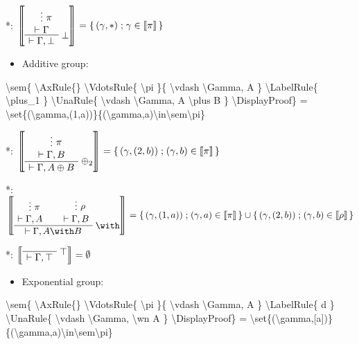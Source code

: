 *: \(\sem{
\AxRule{}
\VdotsRule{ \pi }{ \vdash \Gamma }
\LabelRule{ \bot }
\UnaRule{ \vdash \Gamma, \bot }
\DisplayProof} = \set{(\gamma,*)}{\gamma\in\sem\pi}\)

\begin{itemize}
\tightlist
\item
  Additive group:

  \begin{description}
  \tightlist
  \item[]
  \end{description}
\end{itemize}

\textbackslash{}sem\{ \textbackslash{}AxRule\{\}
\textbackslash{}VdotsRule\{ \textbackslash{}pi \}\{
\textbackslash{}vdash \textbackslash{}Gamma, A \}
\textbackslash{}LabelRule\{ \textbackslash{}plus\_1 \}
\textbackslash{}UnaRule\{ \textbackslash{}vdash \textbackslash{}Gamma, A
\textbackslash{}plus B \} \textbackslash{}DisplayProof\} =
\textbackslash{}set\{(\textbackslash{}gamma,(1,a))\}\{(\textbackslash{}gamma,a)\textbackslash{}in\textbackslash{}sem\textbackslash{}pi\}

*: \(\sem{
\AxRule{}
\VdotsRule{ \pi }{ \vdash \Gamma, B }
\LabelRule{ \plus_2 }
\UnaRule{ \vdash \Gamma, A \plus B }
\DisplayProof} = \set{(\gamma,(2,b))}{(\gamma,b)\in\sem\pi}\)

*: \(\sem{
\AxRule{}
\VdotsRule{ \pi }{ \vdash \Gamma, A }
\AxRule{}
\VdotsRule{ \rho }{ \vdash \Gamma, B }
\LabelRule{ \with }
\BinRule{ \vdash \Gamma, A \with B }
\DisplayProof} = \set{(\gamma,(1,a))}{(\gamma,a)\in\sem\pi} \cup \set{(\gamma,(2,b))}{(\gamma,b)\in\sem\rho}\)

*: \(\sem{
\LabelRule{ \top }
\NulRule{ \vdash \Gamma, \top }
\DisplayProof} = \emptyset\)

\begin{itemize}
\tightlist
\item
  Exponential group:

  \begin{description}
  \tightlist
  \item[]
  \end{description}
\end{itemize}

\textbackslash{}sem\{ \textbackslash{}AxRule\{\}
\textbackslash{}VdotsRule\{ \textbackslash{}pi \}\{
\textbackslash{}vdash \textbackslash{}Gamma, A \}
\textbackslash{}LabelRule\{ d \} \textbackslash{}UnaRule\{
\textbackslash{}vdash \textbackslash{}Gamma, \textbackslash{}wn A \}
\textbackslash{}DisplayProof\} =
\textbackslash{}set\{(\textbackslash{}gamma,{[}a{]})\}\{(\textbackslash{}gamma,a)\textbackslash{}in\textbackslash{}sem\textbackslash{}pi\}

